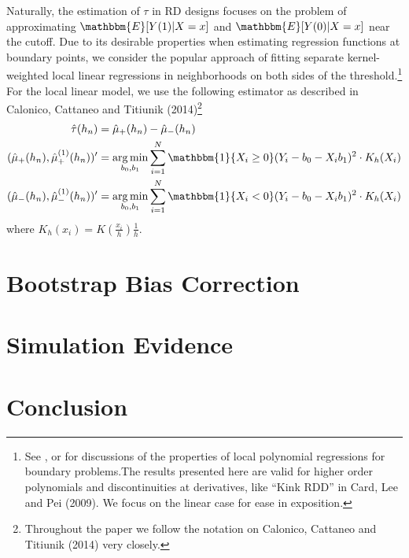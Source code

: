 \documentclass[12pt,fleqn]{article}
\begin{document}
Naturally, the estimation of $\tau$ in RD designs focuses on the 
problem of approximating $\mathbbm{E}[Y(1)|X=x]$ and $\mathbbm{E}[Y(0)|X=x]$ 
near the cutoff. Due to its desirable properties when estimating regression 
functions at boundary points, we consider the popular approach of fitting 
separate kernel-weighted local linear regressions in neighborhoods on both 
sides of the threshold.\footnote{See \cite{HTV2001}, \cite{Porter03} or
\cite{FanGijbels92} for discussions of the properties of local polynomial 
regressions for boundary problems.The results presented here are valid for
higher order polynomials and discontinuities at derivatives, like ``Kink RDD''
in Card, Lee and Pei (2009). We focus on the linear case for ease in exposition.}
For the local linear model, we use the following estimator as described in 
Calonico, Cattaneo and Titiunik (2014)\footnote{Throughout the paper we follow the
notation on Calonico, Cattaneo and Titiunik (2014) very closely.}
\begin{align*}
 \hat{\tau}(h_{n})&=\hat {\mu}_{+}(h_{n}) -\hat{\mu}_{-}(h_{n})\\
(\hat {\mu}_{+}(h_{n}),\hat {\mu}^{(1)}_{+}(h_{n}))'&= \argmin_{b_{0},b_{1}} 
\sum_{i=1}^{N}\mathbbm{1}\{X_{i} \geq 0\}(Y_{i}-b_{0}-X_{i}b_{1})^{2} \cdot K_{h}(X_{i})\\
(\hat {\mu}_{-}(h_{n}),\hat {\mu}^{(1)}_{-}(h_{n}))' &= \argmin_{b_{0},b_{1}}
\sum_{i=1}^{N}\mathbbm{1}\{X_{i} < 0\}(Y_{i}-b_{0}-X_{i}b_{1})^{2}\cdot K_{h}(X_{i})
\end{align*}
where $K_{h}(x_{i}) = K\left(\frac{x_{i}}{h}\right)\frac{1}{h}$.


\section{Bootstrap Bias Correction}\label{boot}

\section{Simulation Evidence}\label{sim}

\section{Conclusion}\label{conclusion}
\end{document}

